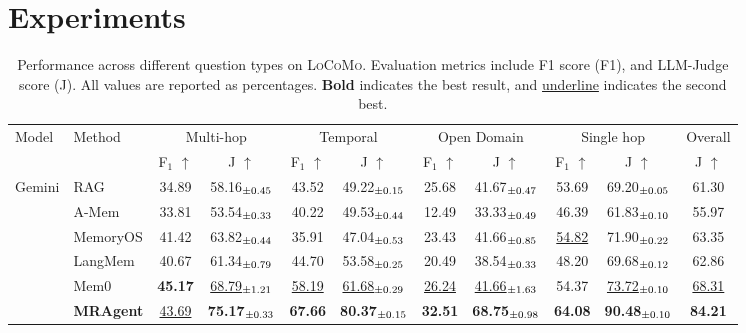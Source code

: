 \section{Experiments}
\begin{table}[t]
\centering
\small
\setlength{\tabcolsep}{6pt}
\caption{Performance across different question types on \textsc{LoCoMo}. Evaluation metrics include F1 score (F1), and LLM-Judge score (J).
All values are reported as percentages. \textbf{Bold} indicates the best result, and \underline{underline} indicates the second best.}
\begin{tabular}{ll|cc|cc|cc|cc|c}
\toprule
Model & Method
& \multicolumn{2}{c|}{Multi-hop}
& \multicolumn{2}{c|}{Temporal}
& \multicolumn{2}{c|}{Open Domain}
& \multicolumn{2}{c|}{Single hop}
& Overall \\
&
& F$_1$ $\uparrow$ & J $\uparrow$
& F$_1$ $\uparrow$ & J $\uparrow$
& F$_1$ $\uparrow$ & J $\uparrow$
& F$_1$ $\uparrow$ & J $\uparrow$
& J $\uparrow$ \\
\midrule

\multirow{6}{*}{Gemini}
& RAG
& 34.89 & 58.16$_{\scriptsize \pm 0.45}$
& 43.52 & 49.22$_{\scriptsize \pm 0.15}$
& 25.68 & 41.67$_{\scriptsize \pm 0.47}$
& 53.69 & 69.20$_{\scriptsize \pm 0.05}$
& 61.30 \\
& A-Mem
& 33.81 & 53.54$_{\scriptsize \pm 0.33}$
& 40.22 & 49.53$_{\scriptsize \pm 0.44}$
& 12.49 & 33.33$_{\scriptsize \pm 0.49}$
& 46.39 & 61.83$_{\scriptsize \pm 0.10}$
& 55.97 \\
& MemoryOS
& 41.42 & 63.82$_{\scriptsize \pm 0.44}$
& 35.91 & 47.04$_{\scriptsize \pm 0.53}$
& 23.43 & 41.66$_{\scriptsize \pm 0.85}$
& \underline{54.82} & 71.90$_{\scriptsize \pm 0.22}$
& 63.35 \\
& LangMem
& 40.67 & 61.34$_{\scriptsize \pm 0.79}$
& 44.70 & 53.58$_{\scriptsize \pm 0.25}$
& 20.49 & 38.54$_{\scriptsize \pm 0.33}$
& 48.20 & 69.68$_{\scriptsize \pm 0.12}$
& 62.86 \\
& Mem0
& \textbf{45.17} & \underline{68.79$_{\scriptsize \pm 1.21}$}
& \underline{58.19} & \underline{61.68$_{\scriptsize \pm 0.29}$}
& \underline{26.24} & \underline{41.66$_{\scriptsize \pm 1.63}$}
& 54.37 & \underline{73.72$_{\scriptsize \pm 0.10}$}
& \underline{68.31} \\
& \textbf{MRAgent}
& \underline{43.69} & \textbf{75.17$_{\scriptsize \pm 0.33}$}
& \textbf{67.66} & \textbf{80.37$_{\scriptsize \pm 0.15}$}
& \textbf{32.51} & \textbf{68.75$_{\scriptsize \pm 0.98}$}
& \textbf{64.08} & \textbf{90.48$_{\scriptsize \pm 0.10}$}
& \textbf{84.21} \\


\end{tabular}
\end{table}
